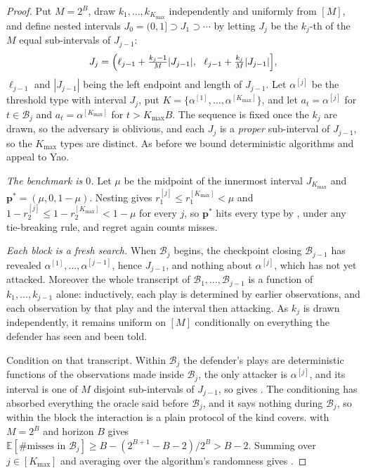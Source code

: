 \documentclass[letterpaper,9pt,twocolumn]{extarticle}
\newcommand{\pvec}{\mathbf{p}}
\newcommand{\EE}{\mathbb{E}}
\newcommand{\Kmax}{K_{\max}}
\newcommand{\cB}{\mathcal{B}}
\theoremstyle{plain}
\theoremstyle{definition}
\theoremstyle{remark}
\begin{document}
\begin{proof}
Put $M=2^{B}$, draw $k_1,\dots,k_{\Kmax}$ independently and uniformly from
$[M]$, and define nested intervals $J_0=(0,1]\supset J_1\supset\cdots$ by
letting $J_j$ be the $k_j$-th of the $M$ equal sub-intervals of $J_{j-1}$:
\begin{equation}
J_j=\Bigl(\ell_{j-1}+\tfrac{k_j-1}{M}|J_{j-1}|,\ \
        \ell_{j-1}+\tfrac{k_j}{M}|J_{j-1}|\Bigr],
\label{eq:nested}
\end{equation}
$\ell_{j-1}$ and $|J_{j-1}|$ being the left endpoint and length of
$J_{j-1}$. Let $\alpha^{[j]}$ be the threshold type with interval $J_j$, put
$K=\{\alpha^{[1]},\dots,\alpha^{[\Kmax]}\}$, and let $a_t=\alpha^{[j]}$ for
$t\in\cB_j$ and $a_t=\alpha^{[\Kmax]}$ for $t>\Kmax B$. The sequence is fixed
once the $k_j$ are drawn, so the adversary is oblivious, and each $J_j$ is a
\emph{proper} sub-interval of $J_{j-1}$, so the $\Kmax$ types are distinct.
As before we bound deterministic algorithms and appeal to Yao.

\emph{The benchmark is $0$.} Let $\mu$ be the midpoint of the innermost
interval $J_{\Kmax}$ and $\pvec^{*}=(\mu,0,1-\mu)$. Nesting gives
$r_1^{[j]}\le r_1^{[\Kmax]}<\mu$ and $1-r_2^{[j]}\le 1-r_2^{[\Kmax]}<1-\mu$
for every $j$, so $\pvec^{*}$ hits every type by \Cref{eq:hit-iff}, under any
tie-breaking rule, and regret again counts misses.

\emph{Each block is a fresh search.} When $\cB_j$ begins, the checkpoint
closing $\cB_{j-1}$ has revealed $\alpha^{[1]},\dots,\alpha^{[j-1]}$, hence
$J_{j-1}$, and nothing about $\alpha^{[j]}$, which has not yet attacked.
Moreover the whole transcript of $\cB_1,\dots,\cB_{j-1}$ is a function of
$k_1,\dots,k_{j-1}$ alone: inductively, each play is determined by earlier
observations, and each observation by that play and the interval then
attacking. As $k_j$ is drawn independently, it remains uniform on $[M]$
conditionally on everything the defender has seen and been told.

Condition on that transcript. Within $\cB_j$ the defender's plays are
deterministic functions of the observations made inside $\cB_j$, the only
attacker is $\alpha^{[j]}$, and its interval is one of $M$ disjoint
sub-intervals of $J_{j-1}$, so \Cref{lem:hit} gives . The
conditioning has absorbed everything the oracle said before $\cB_j$, and it
says nothing during $\cB_j$, so within the block the interaction is a plain
protocol of the kind  covers. \Cref{lem:count} with $M=2^{B}$
and horizon $B$ gives
$\EE[\#\text{misses in }\cB_j]\ge B-(2^{B+1}-B-2)/2^{B}>B-2$. Summing over
$j\in[\Kmax]$ and averaging over the algorithm's randomness gives
\Cref{eq:blocklb}.
\end{proof}
\end{document}
